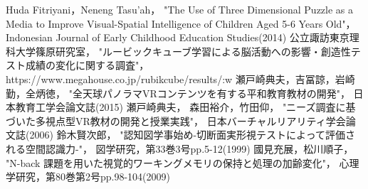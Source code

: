 \begin{thebibliography}{9}
    Huda Fitriyani，Neneng Tasu’ah，
    "The Use of Three Dimensional Puzzle as a Media to Improve Visual-Spatial Intelligence of Children Aged 5-6 Years Old"，
    Indonesian Journal of Early Childhood Education Studies(2014)
    公立諏訪東京理科大学篠原研究室，
    "ルービックキューブ学習による脳活動への影響・創造性テスト成績の変化に関する調査"，
    https://www.megahouse.co.jp/rubikcube/results/:w
    瀬戸崎典夫，吉冨諒，岩崎勤，全炳徳，
    "全天球パノラマVRコンテンツを有する平和教育教材の開発"，
    日本教育工学会論文誌(2015)
    瀬戸崎典夫， 森田裕介，竹田仰，
    "ニーズ調査に基づいた多視点型VR教材の開発と授業実践"，
    日本バーチャルリアリティ学会論文誌(2006)
    鈴木賢次郎，
    "認知図学事始め-切断面実形視テストによって評価される空間認識力-"，
    図学研究，第33巻3号pp.5-12(1999)
    國見充展，松川順子，
    "N-back 課題を用いた視覚的ワーキングメモリの保持と処理の加齢変化"，
    心理学研究，第80巻第2号pp.98-104(2009)
\end{thebibliography}
